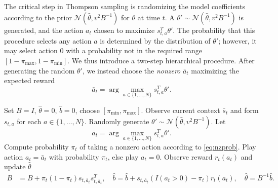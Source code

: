 \documentclass{article}
\begin{document}
The critical step in Thompson sampling is randomizing the model coefficients according to the prior $\mathcal{N}(\hat{\theta},v^2 B^{-1})$ for $\theta$ at time $t$. A $\theta' \sim\mathcal{N}(\hat{\theta},v^2 B^{-1})$ is generated, and the action $a_t$ chosen to maximize $s_{t,a}^T \theta'$.
The probability that this procedure selects any action $a$ is determined by the distribution of $\theta'$; however, it may select action 0 with a probability not in the required range $[1-\pi_{\max}, 1-\pi_{\min}]$. %
We thus introduce a two-step hierarchical procedure. After generating the random $\theta'$, we instead choose the \emph{nonzero} $\bar{a}_t$ maximizing the expected reward
\[
\bar{a}_t = \arg \max_{a \in \{1,\dots,N\}} s_{t,a}^T \theta'.
\]
 \begin{algorithm}[h]
\caption{Action-Centered Thompson Sampling}\label{Alg:Thom}
\begin{algorithmic}[1]
\STATE Set $B =I$, $\hat{\theta} = 0$, $\hat{b} = 0$, choose $[\pi_{\min},\pi_{\max}]$.
\STATE Observe current context $\bar{s}_t$ and form $s_{t,a}$ for each $a \in\{ 1, \dots, N\}$.
\STATE Randomly generate $\theta' \sim\mathcal{N}(\hat{\theta},v^2 B^{-1})$.
\STATE Let
\[
\bar{a}_t = \arg \max_{a \in \{1,\dots,N\}} s_{t,a}^T \theta'.
\]
\STATE Compute probability $\pi_t$ of taking a nonzero action according to \eqref{eq:nzprob}.%
\STATE Play action $a_t = \bar{a}_t$ with probability $\pi_t$, else play $a_t = 0$. 
 \STATE Observe reward $r_t(a_t)$ and update $\hat{\theta}$
\begin{align*}
B  &= B + \pi_t (1-\pi_t)s_{t,\bar{a}_t} s_{t,\bar{a}_t}^T,\quad
\hat b = \hat{b}+ s_{t,\bar{a}_t} (I(a_t > 0)- \pi_t)r_t(a_t),\quad
\hat{\theta} = B^{-1}\hat{b}.
\end{align*}
\ENDFOR
\end{algorithmic}
\end{algorithm}
\end{document}
